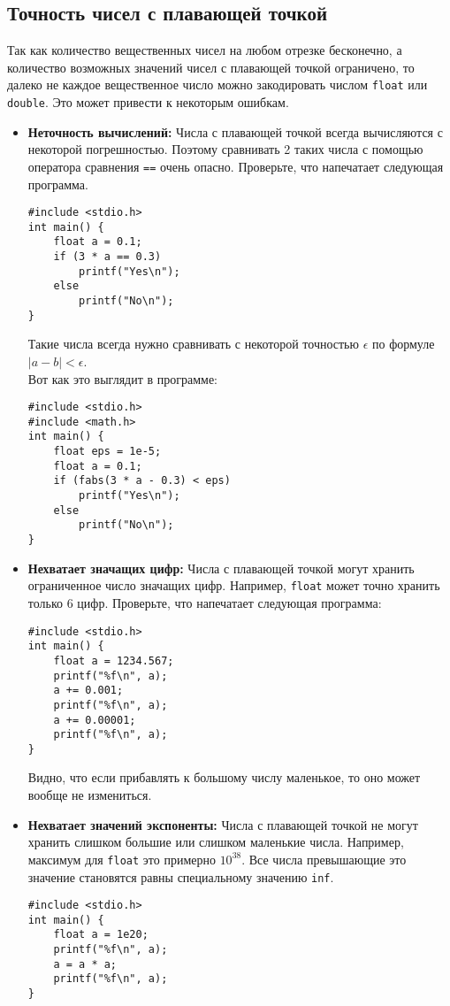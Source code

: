 \documentclass{article}
\begin{document}
\subsection*{Точность чисел с плавающей точкой}
Так как количество вещественных чисел на любом отрезке бесконечно, а количество возможных значений чисел с плавающей точкой ограничено, то далеко не каждое вещественное число можно закодировать числом \texttt{float} или \texttt{double}. Это может привести к некоторым ошибкам.
\begin{itemize}
\item \textbf{Неточность вычислений:} Числа с плавающей точкой всегда вычисляются с некоторой погрешностью. Поэтому сравнивать 2 таких числа с помощью оператора сравнения \texttt{==} очень опасно. Проверьте, что напечатает следующая программа.
\begin{lstlisting}
#include <stdio.h>
int main() {
    float a = 0.1;
    if (3 * a == 0.3)
        printf("Yes\n");
    else
        printf("No\n");
}
\end{lstlisting}

Такие числа всегда нужно сравнивать с некоторой точностью $\epsilon$ по формуле $|a - b| < \epsilon$.\\ 
Вот как это выглядит в программе:
\begin{lstlisting}
#include <stdio.h>
#include <math.h>
int main() {
    float eps = 1e-5;
    float a = 0.1;
    if (fabs(3 * a - 0.3) < eps)
        printf("Yes\n");
    else
        printf("No\n");
}
\end{lstlisting}

\item \textbf{Нехватает значащих цифр:} Числа с плавающей точкой могут хранить ограниченное число значащих цифр. Например, \texttt{float} может точно хранить только 6 цифр. Проверьте, что напечатает следующая программа:
\begin{lstlisting}
#include <stdio.h>
int main() {
    float a = 1234.567;
    printf("%f\n", a);
    a += 0.001;
    printf("%f\n", a);
    a += 0.00001;
    printf("%f\n", a);
}
\end{lstlisting}
Видно, что если прибавлять к большому числу маленькое, то оно может вообще не измениться.

\item \textbf{Нехватает значений экспоненты:} Числа с плавающей точкой не могут хранить слишком большие или слишком маленькие числа. Например, максимум для \texttt{float} это примерно $10^{38}$. Все числа превышающие это значение становятся равны специальному значению \texttt{inf}.
\begin{lstlisting}
#include <stdio.h>
int main() {
    float a = 1e20;
    printf("%f\n", a);
    a = a * a;
    printf("%f\n", a);
}
\end{lstlisting}
\end{itemize}
\end{document}
